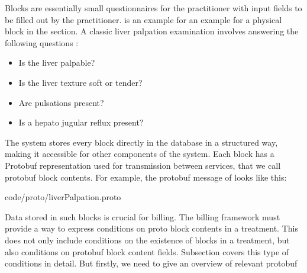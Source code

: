 Blocks are essentially small questionnaires for the practitioner with input fields to be filled out by the practitioner.
 is an example for an example for a physical block in the  section.
A classic liver palpation examination involves answering the following questions \cite{wolf1990evaluation}:
\begin{itemize}
    \item Is the liver palpable?
    \item Is the liver texture soft or tender?
    \item Are pulsations present?
    \item Is a hepato jugular reflux present?
\end{itemize}


The system stores every block directly in the database in a structured way, making it accessible for other components of the system.
Each block has a Protobuf representation used for transmission between services, that we call protobuf block contents.
For example, the protobuf message of  looks like this:

{code/proto/liverPalpation.proto}

Data stored in such blocks is crucial for billing.
The billing framework must provide a way to express conditions on proto block contents in a treatment.
This does not only include conditions on the existence of blocks in a treatment, but also conditions on protobuf block content fields.
Subsection \addref covers this type of conditions in detail.
But firstly, we need to give an overview of relevant protobuf

